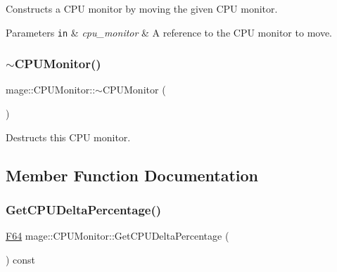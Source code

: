 Constructs a C\+PU monitor by moving the given C\+PU monitor.


\begin{DoxyParams}[1]{Parameters}
\mbox{\tt in}  & {\em cpu\+\_\+monitor} & A reference to the C\+PU monitor to move. \\
\hline
\end{DoxyParams}
\mbox{\label{classmage_1_1_c_p_u_monitor_a597ea4b27675a22d3d66a1d817b26652}} 
\subsubsection{\texorpdfstring{$\sim$\+C\+P\+U\+Monitor()}{~CPUMonitor()}}
{\footnotesize\ttfamily mage\+::\+C\+P\+U\+Monitor\+::$\sim$\+C\+P\+U\+Monitor (\begin{DoxyParamCaption}{ }\end{DoxyParamCaption})\hspace{0.3cm}{\ttfamily [default]}}

Destructs this C\+PU monitor. 

\subsection{Member Function Documentation}
\mbox{\label{classmage_1_1_c_p_u_monitor_a67a4eba9480d15855f6283ec434c215a}} 
\subsubsection{\texorpdfstring{Get\+C\+P\+U\+Delta\+Percentage()}{GetCPUDeltaPercentage()}}
{\footnotesize\ttfamily \mbox{\hyperlink{namespacemage_ad26233bbec640deda836e572c1a23708}{F64}} mage\+::\+C\+P\+U\+Monitor\+::\+Get\+C\+P\+U\+Delta\+Percentage (\begin{DoxyParamCaption}{ }\end{DoxyParamCaption}) const\hspace{0.3cm}{\ttfamily [noexcept]}}

